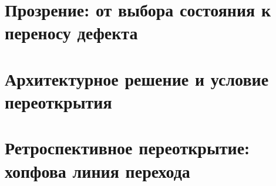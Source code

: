 \documentclass[12pt,a4paper]{report}
\theoremstyle{remark}
\begin{document}
\part{Прозрение: от выбора состояния к переносу дефекта}

















\part{Архитектурное решение и условие переоткрытия}





\part{Ретроспективное переоткрытие: хопфова линия перехода}
\end{document}
